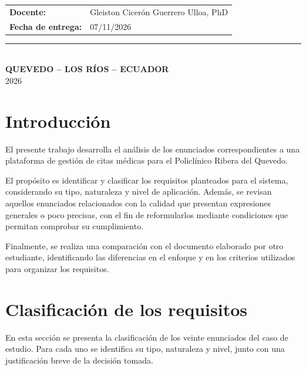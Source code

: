 \documentclass[12pt,a4paper]{article}
\begin{document}
\begin{titlepage}
\begin{minipage}{0.78\textwidth}
\begin{tabular}{@{}>{\bfseries}p{3.5cm}p{8cm}@{}}
            Docente: & Gleiston Cicerón Guerrero Ulloa, PhD \\

            Fecha de entrega: & 07/11/2026
        \end{tabular}
    \end{minipage}

    \vfill

    {\color{azulTabla}\rule{0.85\textwidth}{0.8pt}}\\[0.4cm]

    {\normalsize\textbf{QUEVEDO -- LOS RÍOS -- ECUADOR}}\\[0.15cm]
    {\normalsize 2026}

\end{titlepage}

\section{Introducción}

El presente trabajo desarrolla el análisis de los enunciados
correspondientes a una plataforma de gestión de citas médicas
para el Policlínico Ribera del Quevedo.

El propósito es identificar y clasificar los requisitos
planteados para el sistema, considerando su tipo, naturaleza
y nivel de aplicación. Además, se revisan aquellos enunciados
relacionados con la calidad que presentan expresiones
generales o poco precisas, con el fin de reformularlos
mediante condiciones que permitan comprobar su cumplimiento.

Finalmente, se realiza una comparación con el documento
elaborado por otro estudiante, identificando las diferencias
en el enfoque y en los criterios utilizados para organizar
los requisitos.

\section{Clasificación de los requisitos}

En esta sección se presenta la clasificación de los veinte
enunciados del caso de estudio. Para cada uno se identifica
su tipo, naturaleza y nivel, junto con una justificación
breve de la decisión tomada.
\end{document}

